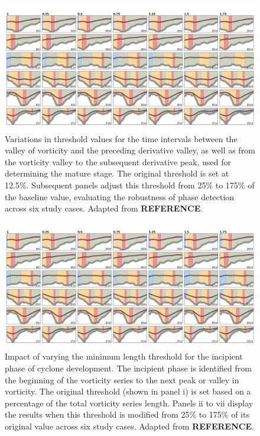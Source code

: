 \begin{figure}[h!]
    \centering
    \includegraphics[width=\textwidth]{figs_3/figure_threshold_mature_length.png}
    \caption[Variations in Threshold Values for Mature Phase]{Variations in threshold values for the time intervals between the valley of vorticity and the preceding derivative valley, as well as from the vorticity valley to the subsequent derivative peak, used for determining the mature stage. The original threshold is set at 12.5\%. Subsequent panels adjust this threshold from 25\% to 175\% of the baseline value, evaluating the robustness of phase detection across six study cases. Adapted from \textbf{REFERENCE}.}
    \label{fig:threshold_mature}
\end{figure}

\begin{figure}[h!]
    \centering
    \includegraphics[width=\textwidth]{figs_3/figure_threshold_incipient_length.png}
    \caption[Impact of Varying Threshold Values for Incipient Phase]{Impact of varying the minimum length threshold for the incipient phase of cyclone development. The incipient phase is identified from the beginning of the vorticity series to the next peak or valley in vorticity. The original threshold (shown in panel i) is set based on a percentage of the total vorticity series length. Panels ii to vii display the results when this threshold is modified from 25\% to 175\% of its original value across six study cases. Adapted from \textbf{REFERENCE}.}
    \label{fig:threshold_incipient}
\end{figure}

